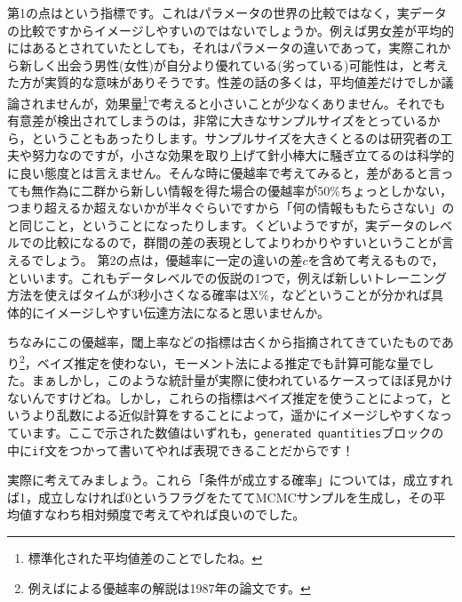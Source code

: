\documentclass{ltjsbook}
\begin{document}
第1の点はという指標です。これはパラメータの世界の比較ではなく，実データの比較ですからイメージしやすいのではないでしょうか。例えば男女差が平均的にはあるとされていたとしても，それはパラメータの違いであって，実際これから新しく出会う男性(女性)が自分より優れている(劣っている)可能性は，と考えた方が実質的な意味がありそうです。性差の話の多くは，平均値差だけでしか議論されませんが，効果量\footnote{標準化された平均値差のことでしたね。}で考えると小さいことが少なくありません。それでも有意差が検出されてしまうのは，非常に大きなサンプルサイズをとっているから，ということもあったりします。サンプルサイズを大きくとるのは研究者の工夫や努力なのですが，小さな効果を取り上げて針小棒大に騒ぎ立てるのは科学的に良い態度とは言えません。そんな時に優越率で考えてみると，差があると言っても無作為に二群から新しい情報を得た場合の優越率が50\%ちょっとしかない，つまり超えるか超えないかが半々ぐらいですから「何の情報ももたらさない」のと同じこと，ということになったりします。くどいようですが，実データのレベルでの比較になるので，群間の差の表現としてよりわかりやすいということが言えるでしょう。
第2の点は，優越率に一定の違いの差$c$を含めて考えるもので，といいます。これもデータレベルでの仮説の1つで，例えば新しいトレーニング方法を使えばタイムが3秒小さくなる確率はX\%，などということが分かれば具体的にイメージしやすい伝達方法になると思いませんか。

ちなみにこの優越率，閾上率などの指標は古くから指摘されてきていたものであり\footnote{例えば\citet{Haebara1987}による優越率の解説は1987年の論文です。}，ベイズ推定を使わない，モーメント法による推定でも計算可能な量でした。まぁしかし，このような統計量が実際に使われているケースってほぼ見かけないんですけどね。しかし，これらの指標はベイズ推定を使うことによって，というより乱数による近似計算をすることによって，遥かにイメージしやすくなっています。ここで示された数値はいずれも，\verb|generated quantities|ブロックの中に\verb|if|文をつかって書いてやれば表現できることだからです！

実際に考えてみましょう。これら「条件が成立する確率」については，成立すれば1，成立しなければ0というフラグをたててMCMCサンプルを生成し，その平均値すなわち相対頻度で考えてやれば良いのでした。
\end{document}
